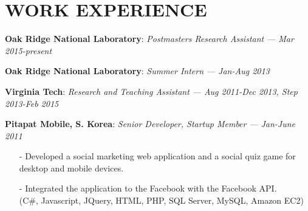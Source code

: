 \section{WORK EXPERIENCE} 
\vspace{0.03in} 
{\bf Oak Ridge National Laboratory}: \emph{Postmasters Research Assistant}
{\it \footnotesize --- Mar 2015-present}
\vspace{-0.15in}

{\bf Oak Ridge National Laboratory}: \emph{Summer Intern}
{\it \footnotesize --- Jan-Aug 2013}
\vspace{-0.15in}

{\bf Virginia Tech}: \emph{Research and Teaching Assistant}
{\it \footnotesize --- Aug 2011-Dec 2013, Step 2013-Feb 2015}
\vspace{-0.15in}

{\bf Pitapat Mobile, S. Korea}: \emph{Senior Developer, Startup Member}
{\it \footnotesize --- Jan-June 2011}
\begin{itemize}[leftmargin=*]
\setlength\itemsep{-0.02in}
 \item[-] Developed a social marketing web application and a social quiz game for 
          desktop and mobile devices.
 \item[-] Integrated the application to the Facebook with the Facebook API.
\\
  {\small(C\#, Javascript, JQuery, HTML, PHP, SQL Server, MySQL, Amazon EC2)}
\end{itemize}
\vspace{-0.15in}

